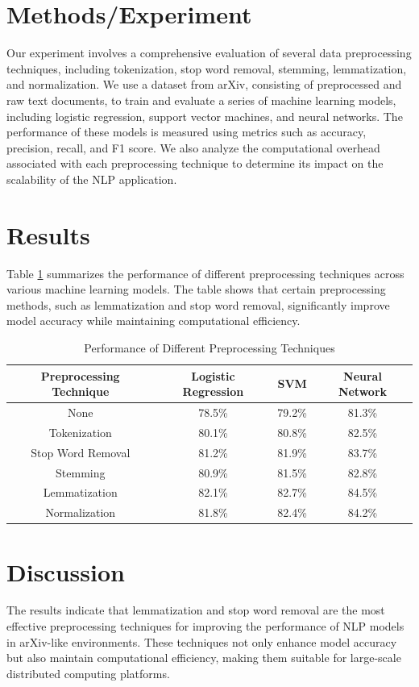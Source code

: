 \documentclass{article}
\begin{document}
\section{Methods/Experiment}
Our experiment involves a comprehensive evaluation of several data preprocessing techniques, including tokenization, stop word removal, stemming, lemmatization, and normalization. We use a dataset from arXiv, consisting of preprocessed and raw text documents, to train and evaluate a series of machine learning models, including logistic regression, support vector machines, and neural networks. The performance of these models is measured using metrics such as accuracy, precision, recall, and F1 score. We also analyze the computational overhead associated with each preprocessing technique to determine its impact on the scalability of the NLP application.

\section{Results}
Table \ref{tab:results} summarizes the performance of different preprocessing techniques across various machine learning models. The table shows that certain preprocessing methods, such as lemmatization and stop word removal, significantly improve model accuracy while maintaining computational efficiency. 

\begin{table}[ht]
\centering
\begin{tabular}{|c|c|c|c|}
\hline
\textbf{Preprocessing Technique} & \textbf{Logistic Regression} & \textbf{SVM} & \textbf{Neural Network} \\ \hline
None & 78.5\% & 79.2\% & 81.3\% \\ \hline
Tokenization & 80.1\% & 80.8\% & 82.5\% \\ \hline
Stop Word Removal & 81.2\% & 81.9\% & 83.7\% \\ \hline
Stemming & 80.9\% & 81.5\% & 82.8\% \\ \hline
Lemmatization & 82.1\% & 82.7\% & 84.5\% \\ \hline
Normalization & 81.8\% & 82.4\% & 84.2\% \\ \hline
\end{tabular}
\caption{Performance of Different Preprocessing Techniques}
\label{tab:results}
\end{table}

\section{Discussion}
The results indicate that lemmatization and stop word removal are the most effective preprocessing techniques for improving the performance of NLP models in arXiv-like environments. These techniques not only enhance model accuracy but also maintain computational efficiency, making them suitable for large-scale distributed computing platforms.
\end{document}
